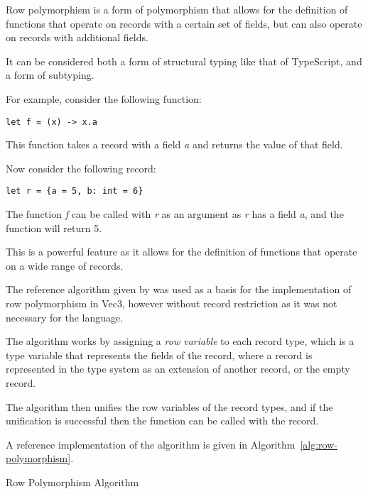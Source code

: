 Row polymorphism is a form of polymorphism that allows for the definition of functions that operate on records with
a certain set of fields, but can also operate on records with additional fields.

It can be considered both a form of structural typing like that of TypeScript\citep{bierman2014understanding}, and a
form of subtyping.

For example, consider the following function:

\begin{verbatim}
let f = (x) -> x.a
\end{verbatim}

This function takes a record with a field \textit{a} and returns the value of that field.

Now consider the following record:

\begin{verbatim}
let r = {a = 5, b: int = 6}
\end{verbatim}

The function \textit{f} can be called with \textit{r} as an argument as \textit{r} has a field \textit{a}, and the
function will return 5.

This is a powerful feature as it allows for the definition of functions that operate on a wide range of records.

The reference algorithm given by \citet{morris2019abstracting} was used as a basis for the implementation of row
polymorphism in Vec3, however without record restriction as it was not necessary for the language.

The algorithm works by assigning a \textit{row variable} to each record type, which is a type variable that represents
the fields of the record, where a record is represented in the type system as an extension of another record, or the empty record.

The algorithm then unifies the row variables of the record types, and if the unification is successful then the
function can be called with the record.

A reference implementation of the algorithm is given in Algorithm~\ref{alg:row-polymorphism}.

\begin{algorithm}
    \caption{Row Polymorphism Algorithm}
    \begin{algorithmic}
    \end{algorithmic}
    \label{alg:row-polymorphism}
\end{algorithm}


